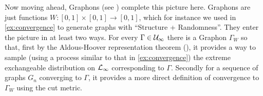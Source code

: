 \documentclass{article}
\begin{document}
Now moving ahead, Graphons (see \cite{lovasz-book}) complete this picture here. Graphons are just functions $W: [0,1] \times [0,1] \to [0,1]$, which for instance we used in \autoref{ex:convergence} to generate graphs with ``Structure + Randomness''. They enter the picture in at least two ways. For every $\Gamma \in \Ug_{\infty}$ there is a Graphon $\Gamma_W$ so that, first by the Aldous-Hoover representation theorem (\cite{aldous}), it provides a way to sample (using a process similar to that in \autoref{ex:convergence}) the extreme exchangeable distribution on $\Lg_{\infty}$ corresponding to $\Gamma$. Secondly for a sequence of graphs $G_n$ converging to $\Gamma$, it provides a more direct definition of convergence to $\Gamma_W$ using the cut metric.

\printbibliography
\end{document}
